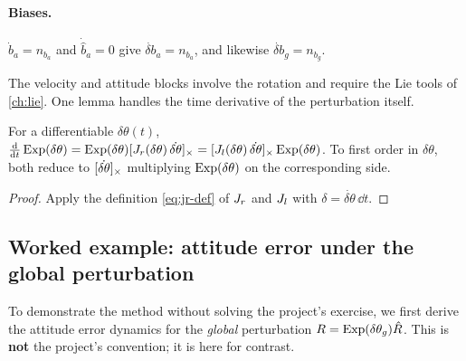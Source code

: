 \paragraph{Biases.} $\dot b_a = n_{b_a}$ and $\dot{\hat b}_a = 0$ give $\dot{\delta b}_a = n_{b_a}$, and likewise
$\dot{\delta b}_g = n_{b_g}$.

The velocity and attitude blocks involve the rotation and require the Lie tools of \cref{ch:lie}. One lemma
handles the time derivative of the perturbation itself.

\begin{lemma}
\label{lem:dexp}
For a differentiable $\delta\theta(t)$,
$\frac{\mathrm{d}}{\mathrm{d} t}\operatorname{Exp}(\delta\theta) = \operatorname{Exp}(\delta\theta)[J_r(\delta\theta)\,\dot{\delta\theta}]_{\times} = [J_l(\delta\theta)\,\dot{\delta\theta}]_{\times}\operatorname{Exp}(\delta\theta)$.
To first order in $\delta\theta$, both reduce to $[\dot{\delta\theta}]_{\times}$ multiplying $\operatorname{Exp}(\delta\theta)$ on the corresponding side.
\end{lemma}
\begin{proof}
Apply the definition \eqref{eq:jr-def} of $J_r$ and $J_l$ with $\delta = \dot{\delta\theta}\,\dd t$.
\end{proof}

\subsection{Worked example: attitude error under the global perturbation}

To demonstrate the method without solving the project's exercise, we first derive the attitude error
dynamics for the \emph{global} perturbation $R = \operatorname{Exp}(\delta\theta_g)\hat R$. This is \textbf{not} the project's
convention; it is here for contrast.

